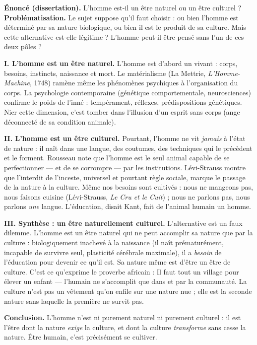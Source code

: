\documentclass[11pt]{article}
\newcommand{\cle}[1]{{\popxbold\color{popdark}#1}}
\begin{document}
\begin{exoresolu}
\textbf{Énoncé (dissertation).} L'homme est-il un être naturel ou un être culturel ?
\tcblower
\textbf{Problématisation.} Le sujet suppose qu'il faut choisir : ou bien l'homme est déterminé par sa nature biologique, ou bien il est le produit de sa culture. Mais cette alternative est-elle légitime ? L'homme peut-il être pensé sans l'un de ces deux pôles ?

\textbf{I. L'homme est un être naturel.} L'homme est d'abord un vivant : corps, besoins, instincts, naissance et mort. Le matérialisme (La Mettrie, \emph{L'Homme-Machine}, 1748) ramène même les phénomènes psychiques à l'organisation du corps. La psychologie contemporaine (génétique comportementale, neurosciences) confirme le poids de l'inné : tempérament, réflexes, prédispositions génétiques. Nier cette dimension, c'est tomber dans l'illusion d'un esprit sans corps (\guillemotleft ange \guillemotright déconnecté de sa condition animale).

\textbf{II. L'homme est un être culturel.} Pourtant, l'homme ne vit \emph{jamais} à l'état de nature : il naît dans une langue, des coutumes, des techniques qui le précèdent et le forment. Rousseau note que l'homme est le seul animal capable de se \cle{perfectionner} — et de se \cle{corrompre} — par les institutions. Lévi-Strauss montre que l'interdit de l'inceste, universel et pourtant règle sociale, marque le passage de la nature à la culture. Même nos besoins sont cultivés : nous ne mangeons pas, nous \cle{faisons cuisine} (Lévi-Strauss, \emph{Le Cru et le Cuit}) ; nous ne parlons pas, nous parlons \emph{une} langue. L'éducation, disait Kant, fait de l'animal humain un homme.

\textbf{III. Synthèse : un être naturellement culturel.} L'alternative est un \cle{faux dilemme}. L'homme est un être naturel qui ne peut accomplir sa nature que par la culture : biologiquement \cle{inachevé} à la naissance (il naît prématurément, incapable de survivre seul, plasticité cérébrale maximale), il a \emph{besoin} de l'éducation pour devenir ce qu'il est. Sa nature même est d'être un être de culture. C'est ce qu'exprime le proverbe africain : \guillemotleft Il faut tout un village pour élever un enfant \guillemotright — l'humain ne s'accomplit que dans et par la communauté. La culture n'est pas un \guillemotleft vêtement \guillemotright qu'on enfile sur une nature nue ; elle est la \cle{seconde nature} sans laquelle la première ne survit pas.

\textbf{Conclusion.} L'homme n'est ni purement naturel ni purement culturel : il est l'être dont la nature \emph{exige} la culture, et dont la culture \emph{transforme} sans cesse la nature. Être humain, c'est précisément \cle{se cultiver}.
\end{exoresolu}
\end{document}
